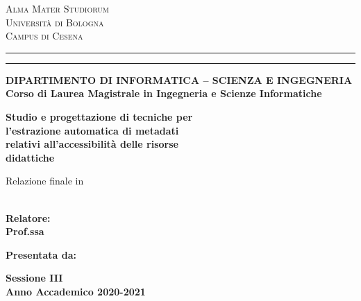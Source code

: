 
\oddsidemargin=25pt

\begin{titlepage}
\begin{center}
{{\Large{\textsc{Alma Mater Studiorum}}}\\
{\Large{\textsc{Universit\`a di Bologna}}} \\
{\textsc{Campus di Cesena}}} \rule[0.1cm]{14cm}{0.1mm}
		\rule[0.5cm]{14cm}{0.6mm}
{\small{\bf DIPARTIMENTO DI INFORMATICA – SCIENZA E INGEGNERIA\\
Corso di Laurea Magistrale in Ingegneria e Scienze Informatiche }}
\end{center}
\vspace{15mm}
\begin{center}
{\LARGE{\bf Studio e progettazione di tecniche per}}\\
\vspace{2mm}
{\LARGE{\bf l'estrazione automatica di metadati}}\\
\vspace{2mm}
{\LARGE{\bf relativi all'accessibilità delle risorse}}\\
\vspace{2mm}
{\LARGE{\bf didattiche}}\\
\end{center}
\vspace{3mm}
\begin{center}
{Relazione finale in}\\
\vspace{2mm}
{\bf \xsubject}\\
\end{center}
\vspace{20mm}
\par
\noindent
\begin{minipage}[t]{0.5\textwidth}
{\large{\bf Relatore:\\
Prof.ssa \xsupervisor}} \\
\end{minipage}
\hfill
\begin{minipage}[t]{0.47\textwidth}\raggedleft
{\large{\bf Presentata da:\\
\xstudent}}
\end{minipage}
\vspace{30mm}
\begin{center}
{\large{\bf Sessione III\\%
Anno Accademico 2020-2021}}%
\end{center}

\newpage
\clearpage{\pagestyle{empty}\cleardoublepage}
\end{titlepage}

